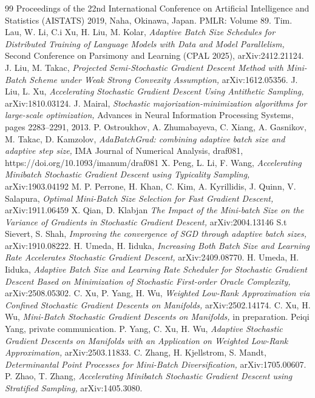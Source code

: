\documentclass{amsart}
\theoremstyle{plain}
\theoremstyle{definition}
\theoremstyle{remark}
\numberwithin{theorem}{section}
\numberwithin{equation}{section}
\begin{document}
\begin{thebibliography}{99}
   Proceedings of the 22nd International Conference on Artificial Intelligence and Statistics (AISTATS) 2019, Naha, Okinawa, Japan. PMLR: Volume 89.
   Tim. Lau, W. Li, C.i Xu, H. Liu, M. Kolar,
   \emph{Adaptive Batch Size Schedules for Distributed Training of Language Models with Data and Model Parallelism,}
   Second Conference on Parsimony and Learning (CPAL 2025), arXiv:2412.21124.
   J. Liu, M. Takac,
   \emph{Projected Semi-Stochastic Gradient Descent Method with Mini-Batch Scheme under Weak Strong Convexity Assumption,}
   arXiv:1612.05356. 
   J. Liu, L. Xu,
   \emph{Accelerating Stochastic Gradient Descent Using Antithetic Sampling,}
   arXiv:1810.03124.
   J. Mairal,
   \emph{Stochastic majorization-minimization algorithms for large-scale optimization,}
   Advances in Neural Information Processing Systems, pages 2283--2291, 2013.
    P. Ostroukhov, A. Zhumabayeva, C. Xiang, A. Gasnikov, M. Takac, D. Kamzolov, 
   \emph{AdaBatchGrad: combining adaptive batch size and adaptive step size,}
   IMA Journal of Numerical Analysis, draf081, https://doi.org/10.1093/imanum/draf081
    X. Peng, L. Li, F. Wang,
   \emph{Accelerating Minibatch Stochastic Gradient Descent using Typicality Sampling,}
    arXiv:1903.04192 
    M. P. Perrone, H. Khan, C. Kim, A. Kyrillidis, J. Quinn, V. Salapura,
   \emph{Optimal Mini-Batch Size Selection for Fast Gradient Descent,}
    arXiv:1911.06459 
    X. Qian, D. Klabjan
   \emph{The Impact of the Mini-batch Size on the Variance of Gradients in Stochastic Gradient Descent,}
    arXiv:2004.13146
   S.t Sievert, S. Shah,
   \emph{Improving the convergence of SGD through adaptive batch sizes,}
   arXiv:1910.08222.
   H. Umeda, H. Iiduka,
   \emph{Increasing Both Batch Size and Learning Rate Accelerates Stochastic Gradient Descent,}
   arXiv:2409.08770.
   H. Umeda, H. Iiduka,
   \emph{Adaptive Batch Size and Learning Rate Scheduler for Stochastic Gradient Descent Based on Minimization of Stochastic First-order Oracle Complexity,}
   arXiv:2508.05302.
   C. Xu, P. Yang, H. Wu,
   \emph{Weighted Low-Rank Approximation via Confined Stochastic Gradient Descents on Manifolds,}
   arXiv:2502.14174.
   C. Xu, H. Wu,
   \emph{Mini-Batch Stochastic Gradient Descents on Manifolds,}
   in preparation.
   Peiqi Yang, 
   private communication.
   P. Yang, C. Xu, H. Wu,
   \emph{Adaptive Stochastic Gradient Descents on Manifolds with an Application on Weighted Low-Rank Approximation,}
   arXiv:2503.11833.
   C. Zhang, H. Kjellstrom, S. Mandt,
   \emph{Determinantal Point Processes for Mini-Batch Diversification,}
   arXiv:1705.00607.
   P. Zhao, T. Zhang,
   \emph{Accelerating Minibatch Stochastic Gradient Descent using Stratified Sampling,}
   arXiv:1405.3080.
\end{thebibliography}
\end{document}
